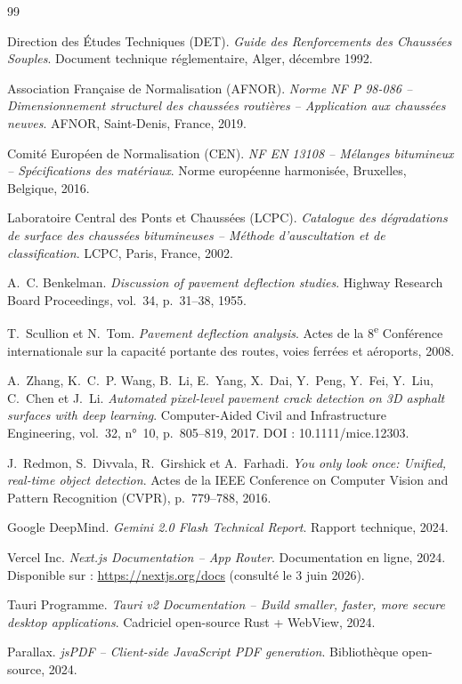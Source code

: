 
\begin{thebibliography}{99}

{Direction des Études Techniques (DET)}.
\textit{Guide des Renforcements des Chaussées Souples}.
Document technique réglementaire, \cttp{} Alger, décembre 1992.

{Association Française de Normalisation (AFNOR)}.
\textit{Norme NF P 98-086 -- Dimensionnement structurel des chaussées
routières -- Application aux chaussées neuves}.
AFNOR, Saint-Denis, France, 2019.

{Comité Européen de Normalisation (CEN)}.
\textit{NF EN 13108 -- Mélanges bitumineux -- Spécifications des matériaux}.
Norme européenne harmonisée, Bruxelles, Belgique, 2016.

{Laboratoire Central des Ponts et Chaussées (LCPC)}.
\textit{Catalogue des dégradations de surface des chaussées bitumineuses
-- Méthode d'auscultation et de classification}.
LCPC, Paris, France, 2002.

A.~C. Benkelman.
\textit{Discussion of pavement deflection studies}.
Highway Research Board Proceedings, vol.~34, p.~31--38, 1955.

T.~Scullion et N.~Tom.
\textit{Pavement deflection analysis}.
Actes de la 8\textsuperscript{e} Conférence internationale sur la capacité
portante des routes, voies ferrées et aéroports, 2008.

A.~Zhang, K.~C.~P. Wang, B.~Li, E.~Yang, X.~Dai, Y.~Peng, Y.~Fei, Y.~Liu,
C.~Chen et J.~Li.
\textit{Automated pixel-level pavement crack detection on 3D asphalt
surfaces with deep learning}.
Computer-Aided Civil and Infrastructure Engineering, vol.~32, n°~10,
p.~805--819, 2017. DOI : 10.1111/mice.12303.

J.~Redmon, S.~Divvala, R.~Girshick et A.~Farhadi.
\textit{You only look once: Unified, real-time object detection}.
Actes de la IEEE Conference on Computer Vision and Pattern Recognition
(CVPR), p.~779--788, 2016.

{Google DeepMind}.
\textit{Gemini 2.0 Flash Technical Report}.
Rapport technique, 2024.

{Vercel Inc.}
\textit{Next.js Documentation -- App Router}.
Documentation en ligne, 2024. Disponible sur : \url{https://nextjs.org/docs}
(consulté le 3 juin 2026).

{Tauri Programme}.
\textit{Tauri v2 Documentation -- Build smaller, faster, more secure
desktop applications}.
Cadriciel open-source Rust + WebView, 2024.

{Parallax}.
\textit{jsPDF -- Client-side JavaScript PDF generation}.
Bibliothèque open-source, 2024.

\end{thebibliography}
